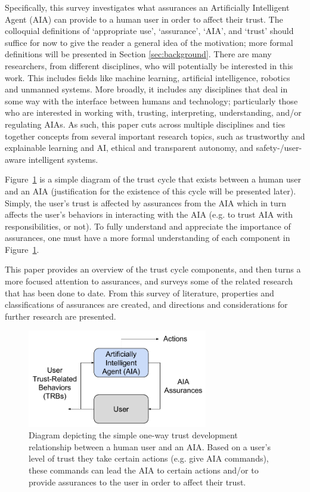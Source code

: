     Specifically, this survey investigates what assurances an Artificially Intelligent Agent (AIA) can provide to a human user in order to affect their trust. The colloquial definitions of `appropriate use', `assurance', `AIA', and `trust' should suffice for now to give the reader a general idea of the motivation; more formal definitions will be presented in Section \ref{sec:background}. There are many researchers, from different disciplines, who will potentially be interested in this work. This includes fields like machine learning, artificial intelligence, robotics and unmanned systems. More broadly, it includes any disciplines that deal in some way with the interface between humans and technology; particularly those who are interested in working with, trusting, interpreting, understanding, and/or regulating AIAs. As such, this paper cuts across multiple disciplines and ties together concepts from several important research topics, such as trustworthy and explainable learning and AI, ethical and transparent autonomy, and safety-/user-aware intelligent systems.

    Figure~\ref{fig:SimpleTrust_one_way} is a simple diagram of the trust cycle that exists between a human user and an AIA (justification for the existence of this cycle will be presented later). Simply, the user's trust is affected by assurances from the AIA which in turn affects the user's behaviors in interacting with the AIA (e.g. to trust AIA with responsibilities, or not). To fully understand and appreciate the importance of assurances, one must have a more formal understanding of each component in Figure~\ref{fig:SimpleTrust_one_way}.

    This paper provides an overview of the trust cycle components, and then turns a more focused attention to assurances, and surveys some of the related research that has been done to date. From this survey of literature, properties and classifications of assurances are created, and directions and considerations for further research are presented.

    \begin{figure}
        \centering
        \includegraphics[width=0.7\textwidth]{Figures/SimpleTrust_one_way}
        \caption{Diagram depicting the simple one-way trust development relationship between a human user and an AIA. Based on a user's level of trust they take certain actions (e.g. give AIA commands), these commands can lead the AIA to certain actions and/or to provide assurances to the user in order to affect their trust.}
        \label{fig:SimpleTrust_one_way}
    \end{figure}

